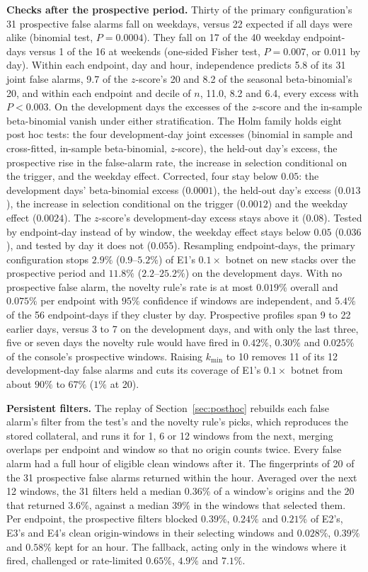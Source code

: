 \documentclass[conference,letterpaper,10pt]{IEEEtran}
\newcommand\1{\textit{(i)}}
\newcommand\2{\textit{(ii)}}
\newcommand\3{\textit{(iii)}}
\newcommand\4{\textit{(iv)}}
\newcommand\5{\textit{(v)}}
\newcommand\6{\textit{(vi)}}
\newcommand\7{\textit{(vii)}}
\newcommand\8{\textit{(viii)}}
\newcommand\9{\textit{(ix)}}
\begin{document}
\textbf{Checks after the prospective period.} Thirty of the primary configuration's 31 prospective false alarms fall on weekdays, versus 22 expected if all days were alike (binomial test, $P = 0.0004$). They fall on 17 of the 40 weekday endpoint-days versus 1 of the 16 at weekends (one-sided Fisher test, $P = 0.007$, or $0.011$ by day). Within each endpoint, day and hour, independence predicts 5.8 of its 31 joint false alarms, 9.7 of the $z$-score's 20 and 8.2 of the seasonal beta-binomial's 20, and within each endpoint and decile of $n$, 11.0, 8.2 and 6.4, every excess with $P < 0.003$. On the development days the excesses of the $z$-score and the in-sample beta-binomial vanish under either stratification. The Holm family holds eight post hoc tests: the four development-day joint excesses (binomial in sample and cross-fitted, in-sample beta-binomial, $z$-score), the held-out day's excess, the prospective rise in the false-alarm rate, the increase in selection conditional on the trigger, and the weekday effect. Corrected, four stay below $0.05$: the development days' beta-binomial excess ($0.0001$), the held-out day's excess ($0.013$), the increase in selection conditional on the trigger ($0.0012$) and the weekday effect ($0.0024$). The $z$-score's development-day excess stays above it ($0.08$). Tested by endpoint-day instead of by window, the weekday effect stays below $0.05$ ($0.036$), and tested by day it does not ($0.055$). Resampling endpoint-days, the primary configuration stops $2.9\%$ ($0.9$--$5.2\%$) of E1's $0.1\times$ botnet on new stacks over the prospective period and $11.8\%$ ($2.2$--$25.2\%$) on the development days. With no prospective false alarm, the novelty rule's rate is at most $0.019\%$ overall and $0.075\%$ per endpoint with $95\%$ confidence if windows are independent, and $5.4\%$ of the 56 endpoint-days if they cluster by day. Prospective profiles span 9 to 22 earlier days, versus 3 to 7 on the development days, and with only the last three, five or seven days the novelty rule would have fired in $0.42\%$, $0.30\%$ and $0.025\%$ of the console's prospective windows. Raising $k_{\min}$ to 10 removes 11 of its 12 development-day false alarms and cuts its coverage of E1's $0.1\times$ botnet from about $90\%$ to $67\%$ ($1\%$ at 20).

\textbf{Persistent filters.} The replay of Section~\ref{sec:posthoc} rebuilds each false alarm's filter from the test's and the novelty rule's picks, which reproduces the stored collateral, and runs it for 1, 6 or 12 windows from the next, merging overlaps per endpoint and window so that no origin counts twice. Every false alarm had a full hour of eligible clean windows after it. The fingerprints of 20 of the 31 prospective false alarms returned within the hour. Averaged over the next 12 windows, the 31 filters held a median $0.36\%$ of a window's origins and the 20 that returned $3.6\%$, against a median $39\%$ in the windows that selected them. Per endpoint, the prospective filters blocked $0.39\%$, $0.24\%$ and $0.21\%$ of E2's, E3's and E4's clean origin-windows in their selecting windows and $0.028\%$, $0.39\%$ and $0.58\%$ kept for an hour. The fallback, acting only in the windows where it fired, challenged or rate-limited $0.65\%$, $4.9\%$ and $7.1\%$.
\end{document}
